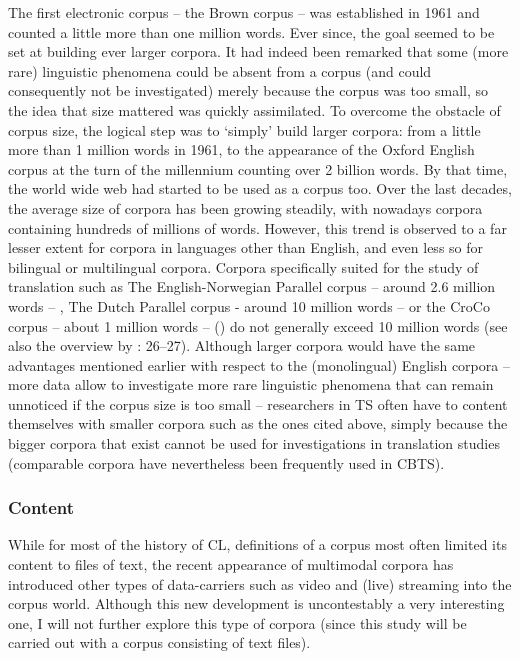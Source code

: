 The first electronic corpus – the Brown corpus – was established in 1961 and counted a little more than one million words. Ever since, the goal seemed to be set at building ever larger corpora. It had indeed been remarked that some (more rare) linguistic phenomena could be absent from a corpus (and could consequently not be investigated) merely because the corpus was too small, so the idea that size mattered was quickly assimilated. To overcome the obstacle of corpus size, the logical step was to ‘simply’ build larger corpora: from a little more than 1 million words in 1961, to the appearance of the Oxford English corpus at the turn of the millennium counting over 2 billion words. By that time, the world wide web had started to be used as a corpus too. Over the last decades, the average size of corpora has been growing steadily, with nowadays corpora containing hundreds of millions of words. However, this trend is observed to a far lesser extent for corpora in languages other than English, and even less so for bilingual or multilingual corpora. Corpora specifically suited for the study of translation such as The English-Norwegian Parallel corpus – around 2.6 million words – \citep{johansson_role_1998}, The Dutch Parallel corpus - around 10 million words – \citep{macken_dutch_2011} or the CroCo corpus – about 1 million words – (\citealt{hansen-schirra_towards_2012}) do not generally exceed 10 million words (see also the overview by \citealt{zanettin_corpus_2013}: 26–27). Although larger corpora would have the same advantages mentioned earlier with respect to the (monolingual) English corpora – more data allow to investigate more rare linguistic phenomena that can remain unnoticed if the corpus size is too small – researchers in TS often have to content themselves with smaller corpora such as the ones cited above, simply because the bigger corpora that exist cannot be used for investigations in translation studies (comparable corpora have nevertheless been frequently used in CBTS).


\subsubsection{\label{sec:2.2.1.2}  Content}

While for most of the history of CL, definitions of a corpus most often limited its content to files of text, the recent appearance of multimodal corpora has introduced other types of data-carriers such as video and (live) streaming into the corpus world. Although this new development is uncontestably a very interesting one, I will not further explore this type of corpora (since this study will be carried out with a corpus consisting of text files).




